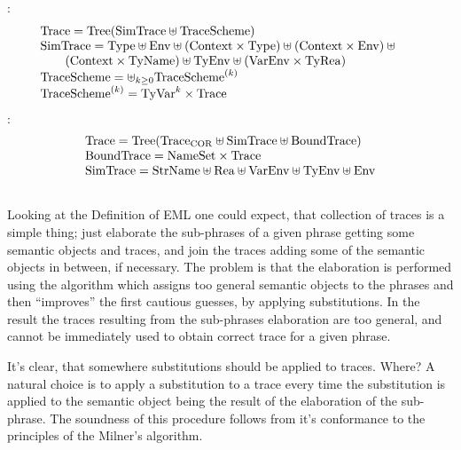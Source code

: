 \cite{KST97}:
\begin{displaymath}
\begin{array}{l}
\Trace = \Tree{\mbox{\SimTrace} \uplus\TraceScheme}\\
\SimTrace = \Type\uplus\Env\uplus(\Context\times\Type)\uplus(\Context\times\Env)\uplus\phantom{\Env}\\
\qquad (\Context\times\TyNames)\uplus\TyEnv\uplus(\VarEnv\times\TyRea)\\
\TraceScheme = \uplus_{k\geq 0} \TraceScheme^{(k)}\\
\TraceScheme^{(k)}=\mbox{TyVar}^k\times\Trace
\end{array}
\end{displaymath} 
\cite{JKS96}:
\begin{displaymath}
\begin{array}{l}
\mbox{Trace} = \mbox{Tree}(\mbox{Trace}_{\rm COR}\uplus\mbox{SimTrace}\uplus\mbox{BoundTrace})\\
\mbox{BoundTrace}={\rm NameSet}\times\mbox{Trace}\\
\mbox{SimTrace} = {\rm StrName}\uplus\mbox{Rea}\uplus{\rm VarEnv}\uplus{\rm TyEnv}\uplus{\rm Env}\\
\end{array}
\end{displaymath}
\subsection{\secsubstitutions}
\label{sec:substitutions}

{
Looking at the Definition of EML one could expect, that collection of traces is
a simple thing; just elaborate the sub-phrases of a given phrase getting some
semantic objects and traces, and join the traces adding some of the semantic objects 
in between, if necessary. The problem is that the elaboration is performed using
the algorithm which assigns too general semantic objects to the phrases and then
``improves'' the first cautious guesses, by applying substitutions.
In the result the traces resulting from the sub-phrases elaboration are 
too general, and cannot be immediately used to obtain correct trace for a given phrase.

It's clear, that somewhere substitutions should be applied to traces. Where?
A natural choice is to apply a substitution to a trace every time the substitution is applied
to the semantic object being the result of the elaboration of the sub-phrase.
The soundness of this procedure follows from it's conformance to the principles of the Milner's algorithm.

}
{}

\subsection{\secscheme}
\label{sec:scheme}


